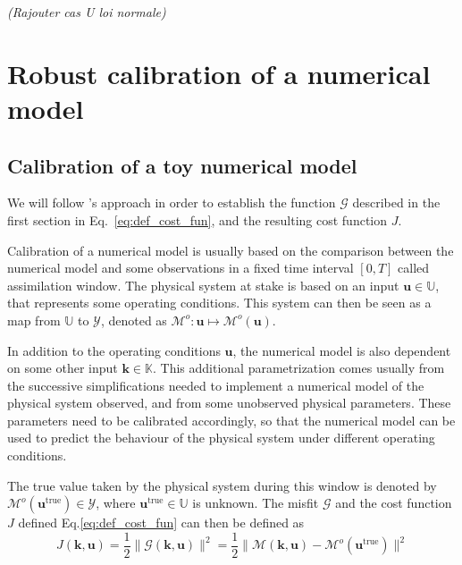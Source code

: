 \documentclass[preprint, 1p]{elsarticle}
\newcommand{\Kspace}{\mathbb{K}}
\newcommand{\Uspace}{\mathbb{U}}
\newcommand{\victor}[1]{{\itshape\color{green} ({#1})}}
\begin{document}
\victor{Rajouter cas U loi normale}


\clearpage

\section{Robust calibration of a numerical model}
\label{sec:SWE_application}

\subsection{Calibration of a toy numerical model}
 We will follow \citeauthor{kennedy_bayesian_2001}'s approach in order to establish the function $\mathcal{G}$ described in the first section in Eq.~\eqref{eq:def_cost_fun}, and the resulting cost function $J$.
 
 Calibration of a numerical model is usually based on the comparison between the numerical model and some observations in a fixed time interval $[0, T]$ called assimilation window.
The physical system at stake is based on an input $\mathbf{u} \in \Uspace$, that represents some operating conditions. This system can then be seen as a map from $\Uspace$ to $\mathcal{Y}$, denoted as $\mathcal{M}^o : \mathbf{u}\mapsto \mathcal{M}^o(\mathbf{u})$. 

In addition to the operating conditions $\mathbf{u}$, the numerical model is also dependent on some other input $\mathbf{k}\in\Kspace$. This additional parametrization comes usually from the successive simplifications needed to implement a numerical model of the physical system observed, and from some unobserved physical parameters. These parameters need to be calibrated accordingly, so that the numerical model can be used to predict the behaviour of the physical system under different operating conditions.

The true value taken by the physical system during this window is denoted by $\mathcal{M}^o(\mathbf{u}^{\mathrm{true}}) \in \mathcal{Y}$, where $\mathbf{u}^{\mathrm{true}} \in \Uspace$ is unknown. The misfit $\mathcal{G}$ and the cost function $J$ defined Eq.\eqref{eq:def_cost_fun} can then be defined as
\begin{equation}
J(\mathbf{k},\mathbf{u}) = \frac12 \| \mathcal{G}(\mathbf{k},\mathbf{u}) \|^2 = \frac12 \|\mathcal{M}(\mathbf{k},\mathbf{u}) - \mathcal{M}^{o}(\mathbf{u}^{\mathrm{true}}) \|^2
\end{equation}
\end{document}

